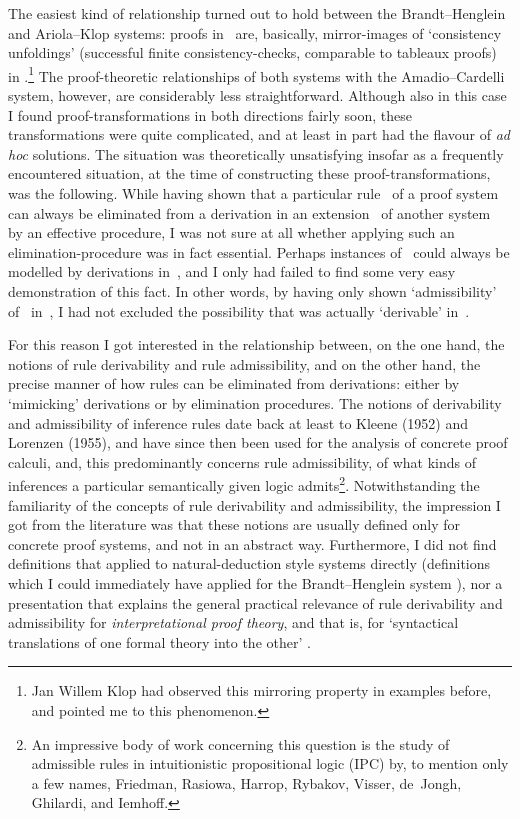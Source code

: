 \documentclass[envcountsame,runningheads]{llncs}
\newcommand{\AKeq}{} \newcommand{\ACeq}{} \newcommand{\BHeq}{}
\begin{document}
The easiest kind of relationship turned out to hold between the Brandt--Henglein 
and Ariola--Klop systems: proofs in \BHeq\ are, basically, mirror-images of 
`consistency unfoldings' (successful finite consistency-checks,
comparable to tableaux proofs) in \AKeq.\footnote{Jan Willem Klop had observed this mirroring property in examples
    before, and pointed me to this phenomenon.}
The proof-theoretic relationships of both systems with the Amadio--Cardelli system,
however, are considerably less straightforward. 
Although also in this case I found proof-transformations 
in both directions fairly soon, these transformations were quite complicated, 
and at least in part had the flavour of \emph{ad hoc} solutions.
The situation was theoretically unsatisfying insofar as a frequently
encountered situation, at the time of constructing these proof-transformations,
was the following.
While having shown that a particular rule~ of a proof system~
can always be eliminated from a derivation in an extension~
of another system~ by an effective procedure,
I was not sure at all whether applying such an elimination-procedure
was in fact essential. Perhaps instances of~ could always
be modelled by derivations in~,
and I only had failed to find some very easy demonstration of this fact.
In other words, by having only shown `admissibility' of~ in~,
I had not excluded the possibility that  was actually `derivable'
in~. 

For this reason I got interested in the relationship between, on the one hand,
the notions of rule derivability and rule admissibility,
and on the other hand, the precise manner of how rules can be eliminated
from derivations: either by `mimicking' derivations or by elimination procedures.
The notions of derivability and admissibility of inference rules date
back at least to Kleene \cite{klee:1952} (1952) and Lorenzen \cite{lore:1955} (1955),
and have since then been used for the analysis of concrete
proof calculi, and, this predominantly concerns rule admissibility, 
of what kinds of 
inferences a particular semantically given logic admits\footnote{An impressive body of work concerning this question is the study of
    admissible rules in intuitionistic propositional logic (IPC)
    by, to mention only a few names, Friedman, Rasiowa, Harrop, Rybakov, 
    Visser, de~Jongh, Ghilardi, and Iemhoff.}.
Notwithstanding the familiarity of the concepts of rule derivability and admissibility,
the impression I got from the literature was that
these notions are usually defined only for concrete proof systems, and not 
in an abstract way. Furthermore, I did not find definitions that
applied to natural-deduction style systems directly (definitions which
I could immediately have applied for the Brandt--Henglein system \BHeq),
nor a presentation that explains the general practical relevance
of rule derivability and admissibility for \emph{interpretational proof theory},
and that is, for `syntactical translations of one formal theory into the other'
\cite{troe:schw:2000}.
\end{document}
